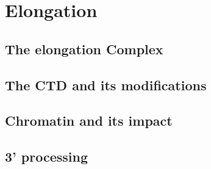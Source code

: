 \section{Elongation}

\subsection{The elongation Complex}

\subsection{The CTD and its modifications}

\subsection{Chromatin and its impact}

\subsection{3' processing}
